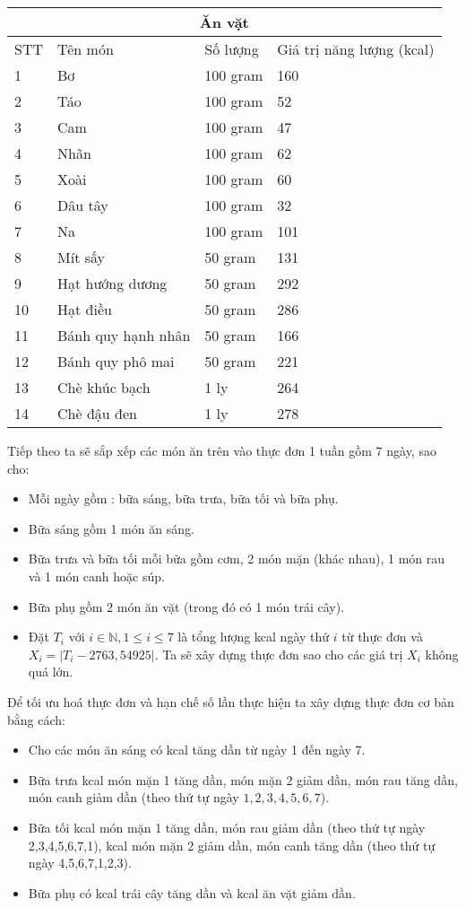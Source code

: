 \begin{center}
\begin{tabular}{ | m{1cm} | m{4cm}| m{3cm} | m{4cm}|}
 \hline
 \multicolumn{4}{|c|}{Ăn vặt} \\
 \hline
  STT& Tên món & Số lượng & Giá trị năng lượng (kcal) \\ 
\hline
  1 & Bơ & 100 gram & 160 \\ 
 \hline
  2 & Táo & 100 gram & 52 \\ 
 \hline
   3& Cam & 100 gram & 47 \\ 
 \hline
   4 & Nhãn & 100 gram & 62 \\ 
 \hline
   5 & Xoài & 100 gram & 60 \\ 
 \hline
   6 & Dâu tây & 100 gram & 32 \\ 
 \hline
   7 & Na & 100 gram & 101 \\ 
 \hline
    8 & Mít sấy & 50 gram & 131 \\ 
 \hline
    9 & Hạt hướng dương & 50 gram & 292 \\ 
 \hline
    10 & Hạt điều & 50 gram & 286 \\ 
 \hline
    11 & Bánh quy hạnh nhân & 50 gram & 166 \\ 
 \hline
    12 & Bánh quy phô mai & 50 gram & 221 \\ 
 \hline
    13 & Chè khúc bạch & 1 ly & 264 \\ 
 \hline
    14 & Chè đậu đen & 1 ly & 278 \\ 
 \hline
\end{tabular}
\end{center}
Tiếp theo ta sẽ sắp xếp các món ăn trên vào thực đơn 1 tuần gồm 7 ngày, sao cho:
\begin{itemize}
    \item Mỗi ngày gồm : bữa sáng, bữa trưa, bữa tối và bữa phụ.
    \item Bữa sáng gồm 1 món ăn sáng.
    \item Bữa trưa và bữa tối mỗi bữa gồm cơm, 2 món mặn (khác nhau), 1 món rau và 1 món canh hoặc súp.
    \item Bữa phụ gồm 2 món ăn vặt (trong đó có 1 món trái cây).
    \item Đặt $T_i$ với $i \in \mathbb{N}, 1 \leq i \leq 7$ là tổng lượng kcal ngày thứ $i$ từ thực đơn và $X_i= |T_i - 2763,54925|$. Ta sẽ xây dựng thực đơn sao cho các giá trị $X_i$ không quá lớn.
\end{itemize}
Để tối ưu hoá thực đơn và hạn chế số lần thực hiện ta xây dựng thực đơn cơ bản bằng cách:
\begin{itemize}
    \item Cho các món ăn sáng có kcal tăng dần từ ngày 1 đến ngày 7.
    \item Bữa trưa kcal món mặn 1 tăng dần, món mặn 2 giảm dần, món rau tăng dần, món canh giảm dần (theo thứ tự ngày $1, 2, 3, 4, 5, 6, 7$).
    \item Bữa tối kcal món mặn 1 tăng dần, món rau giảm dần (theo thứ tự ngày 2,3,4,5,6,7,1), kcal món mặn 2 giảm dần, món canh tăng dần (theo thứ tự ngày 4,5,6,7,1,2,3).
    \item Bữa phụ có kcal trái cây tăng dần và kcal ăn vặt giảm dần.
\end{itemize}
